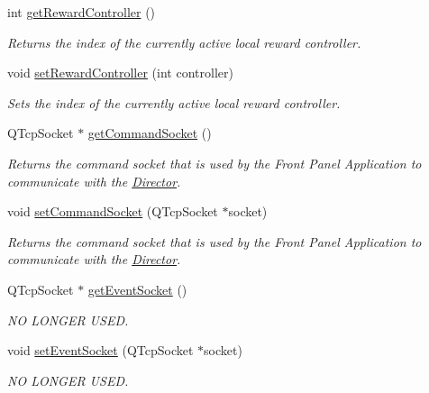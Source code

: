 \begin{DoxyCompactItemize}
\item 
int \hyperlink{class_front_panel_info_a1404dbe64ee8cd75ddd96b2e57f5ecd1}{get\-Reward\-Controller} ()
\begin{DoxyCompactList}\small\item\em Returns the index of the currently active local reward controller. \end{DoxyCompactList}\item 
void \hyperlink{class_front_panel_info_a88b8b370b6cb18d68d541c698a806b08}{set\-Reward\-Controller} (int controller)
\begin{DoxyCompactList}\small\item\em Sets the index of the currently active local reward controller. \end{DoxyCompactList}\item 
Q\-Tcp\-Socket $\ast$ \hyperlink{class_front_panel_info_a4ecaff5133fcf4fbb926ad45165203b1}{get\-Command\-Socket} ()
\begin{DoxyCompactList}\small\item\em Returns the command socket that is used by the Front Panel Application to communicate with the \hyperlink{class_director}{Director}. \end{DoxyCompactList}\item 
void \hyperlink{class_front_panel_info_add749a5bcfd4f7b36b3d4cdbb252db5c}{set\-Command\-Socket} (Q\-Tcp\-Socket $\ast$socket)
\begin{DoxyCompactList}\small\item\em Returns the command socket that is used by the Front Panel Application to communicate with the \hyperlink{class_director}{Director}. \end{DoxyCompactList}\item 
\hypertarget{class_front_panel_info_a4db64aad7a688139090db23adbfcad9e}{Q\-Tcp\-Socket $\ast$ \hyperlink{class_front_panel_info_a4db64aad7a688139090db23adbfcad9e}{get\-Event\-Socket} ()}\label{class_front_panel_info_a4db64aad7a688139090db23adbfcad9e}

\begin{DoxyCompactList}\small\item\em N\-O L\-O\-N\-G\-E\-R U\-S\-E\-D. \end{DoxyCompactList}\item 
\hypertarget{class_front_panel_info_a67f78be189f14830325609f7bde592b4}{void \hyperlink{class_front_panel_info_a67f78be189f14830325609f7bde592b4}{set\-Event\-Socket} (Q\-Tcp\-Socket $\ast$socket)}\label{class_front_panel_info_a67f78be189f14830325609f7bde592b4}

\begin{DoxyCompactList}\small\item\em N\-O L\-O\-N\-G\-E\-R U\-S\-E\-D. \end{DoxyCompactList}\end{DoxyCompactItemize}


